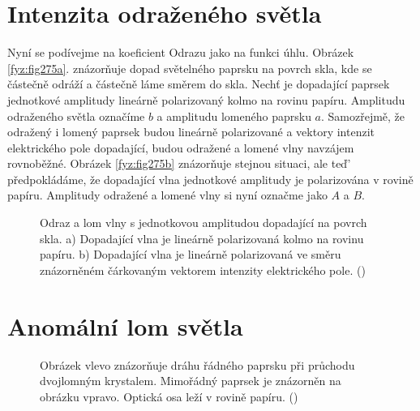   \section{Intenzita odraženého světla}\label{fyz:IchapXXXIIIsecVI}
    Nyní se podívejme na koeﬁcient Odrazu jako na funkci úhlu. Obrázek \ref{fyz:fig275a}. znázorňuje
    dopad světelného paprsku na povrch skla, kde se částečně odráží a částečně láme směrem do skla.
    Nechť je dopadající paprsek jednotkové amplitudy lineárně polarizovaný kolmo na rovinu papíru.
    Amplitudu odraženého světla označíme \(b\) a amplitudu lomeného paprsku \(a\). Samozřejmě, že
    odražený i lomený paprsek budou lineárně polarizované a vektory intenzit elektrického pole
    dopadající, budou odražené a lomené vlny navzájem rovnoběžné. Obrázek \ref{fyz:fig275b}
    znázorňuje stejnou situaci, ale teď' předpokládáme, že dopadající vlna jednotkové amplitudy je
    polarizována v rovině papíru. Amplitudy odražené a lomené vlny si nyní označme jako \(A\) a
    \(B\).
  
    \begin{figure}[ht!]  %
      \centering
      \caption{Odraz a lom vlny s jednotkovou amplitudou dopadající na povrch skla. a) Dopadající
              vlna je lineárně polarizovaná kolmo na rovinu papíru. b) Dopadající vlna je lineárně
              polarizovaná ve směru znázorněném čárkovaným vektorem intenzity elektrického pole.      
              (\cite[s.~437]{Feynman01})}
      \label{fyz:fig275}
    \end{figure}

  \section{Anomální lom světla}\label{fyz:IchapXXXIIIsecVIII}

    \begin{figure}[ht!]  %
      \centering
       \newline
      \caption{Obrázek vlevo znázorňuje dráhu řádného paprsku při průchodu dvojlomným krystalem.
              Mimořádný paprsek je znázorněn na obrázku vpravo. Optická osa leží v rovině papíru.
              (\cite[s.~437]{Feynman01})}
      \label{fyz:fig276}
    \end{figure}

